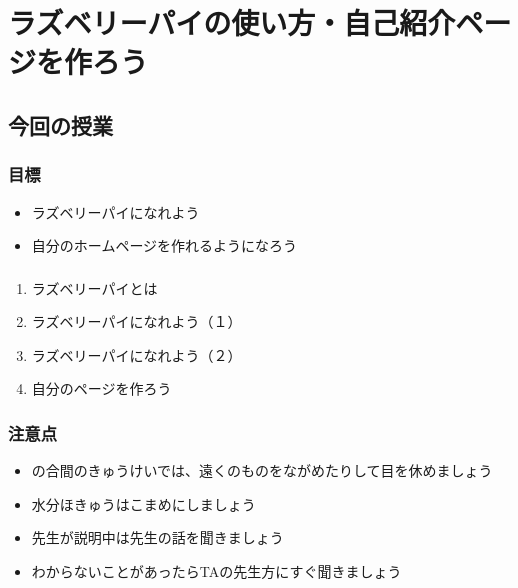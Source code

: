 %
% 
\chapter{ラズベリーパイの使い方・自己紹介ページを作ろう}

% 
% 
\section{今回の授業}

% 
% 
\subsection{目標}

\begin{itemize}
  \item ラズベリーパイになれよう
  \item 自分のホームページを作れるようになろう
\end{itemize}

% 
% 
\subsection{}

\begin{enumerate}
  \item ラズベリーパイとは
  \item ラズベリーパイになれよう（１）
  \item ラズベリーパイになれよう（２）
  \item 自分のページを作ろう
\end{enumerate}

% 
% 
\subsection{注意点}

\begin{itemize}
  \item {}の合間のきゅうけいでは、遠くのものをながめたりして目を休めましょう
  \item 水分ほきゅうはこまめにしましょう
  \item 先生が説明中は先生の話を聞きましょう
  \item わからないことがあったらTAの先生方にすぐ聞きましょう
\end{itemize}

